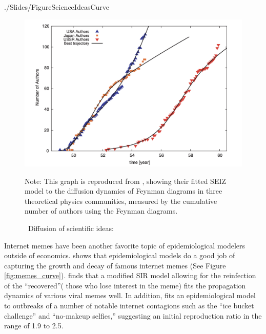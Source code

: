 
\begin{verbatimwrite}{./Slides/FigureScienceIdeasCurve}
	\begin{figure}[!ht] \centering  %
		\caption{ ~Diffusion of scientific ideas: \href{http://web.mit.edu/dikaiser/www/BAKC.PhysA.pdf}{\cite{bettencourt2006power}}}
		\label{fig:science_ideas_curve}
		\centerline{\includegraphics[width=\textwidth]{./figures/Feynman.png}}
		\begin{flushleft}{\footnotesize Note: This graph is reproduced from \cite{bettencourt2006power}, showing their fitted SEIZ model to the diffusion dynamics of Feynman diagrams in three theoretical physics communities, measured by the cumulative number of authors using the Feynman diagrams.}
		\end{flushleft}
	\end{figure}
\end{verbatimwrite}%





Internet memes have been another favorite topic of epidemiological modelers outside of economics. \href{https://github.com/iworld1991/EpiExp/blob/master/Literature/bauckhage2011insights.pdf}{\cite{bauckhage2011insights}} shows that epidemiological models do a good job of capturing the growth and decay of famous internet memes (See Figure \ref{fig:memes_curve}).  \cite{wang2011epidemiological} finds that a modified SIR model allowing for the reinfection of the ``recovered''( those who lose interest in the meme) fits  the propagation dynamics of various viral memes well. In addition,   \href{https://github.com/iworld1991/EpiExp/blob/master/Literature/kucharski2016modelling.pdf}{\cite{kucharski2016modelling}} fits an epidemiological model to outbreaks of a number of notable internet contagions such as the ``ice bucket challenge'' and ``no-makeup selfies,'' suggesting an initial reproduction ratio in the range of 1.9 to 2.5.

